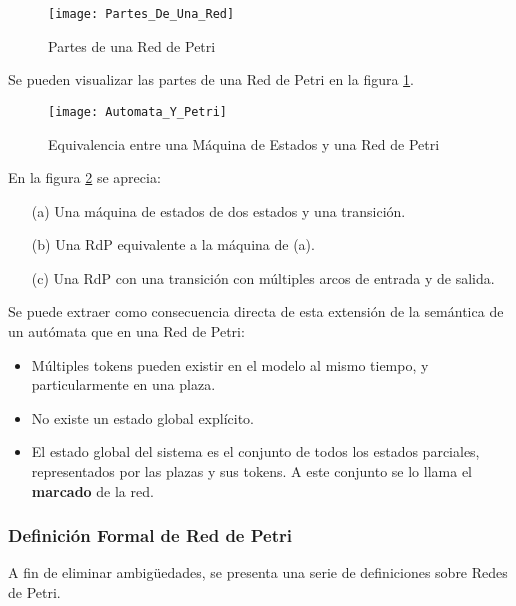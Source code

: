 \begin{figure}[h]
	\centering
	\texttt{[image: Partes\_De\_Una\_Red]}
	\caption{Partes de una Red de Petri}
	\label{fig:partes_de_una_red}
\end{figure}

Se pueden visualizar las partes de una Red de Petri en la figura
\ref{fig:partes_de_una_red}.\\

\begin{figure}[h]
    \centering
    \texttt{[image: Automata\_Y\_Petri]}
    \caption{Equivalencia entre una Máquina de Estados y una Red de Petri}
    \label{fig:automata_y_petri}
\end{figure}

En la figura \ref{fig:automata_y_petri} se aprecia:\\
\begin{itemize}
  \item[(a)] Una máquina de estados de dos estados y una transición.
  \item[(b)] Una RdP equivalente a la máquina de (a).
  \item[(c)] Una RdP con una transición con múltiples arcos de entrada y de
  salida.
\end{itemize}

Se puede extraer como consecuencia directa de esta extensión de la semántica de
un autómata que en una Red de Petri:
\begin{itemize}
  \item Múltiples tokens pueden existir en el modelo al mismo tiempo, y
  particularmente en una plaza.
  \item No existe un estado global explícito.
  \item El estado global del sistema es el conjunto de todos los estados
  parciales, representados por las plazas y sus tokens. A este conjunto se lo
  llama el \textbf{marcado} de la red.
\end{itemize}

\subsubsection{Definición Formal de Red de Petri}
A fin de eliminar ambigüedades, se presenta una serie de definiciones sobre
Redes de Petri.


